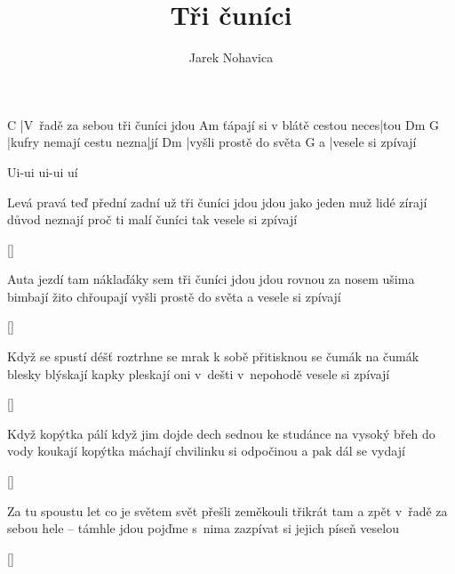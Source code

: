 \documentclass{song}
\author{Jarek Nohavica}
\title{Tři čuníci}
\begin{document}
\begin{multicols}{2}
\strophe
C
|V~řadě za sebou tři čuníci jdou
                              Am
ťápají si v blátě cestou neces|tou
Dm                       G\7
|kufry nemají cestu nezna|jí
Dm
|vyšli prostě do světa
  G\7
a |vesele si zpívají
\endstrophe

 Ui-ui ui-ui uí
\endstrophe

\strophe*
Levá pravá teď přední zadní už
tři čuníci jdou jdou jako jeden muž
lidé zírají důvod neznají
proč ti malí čuníci
tak vesele si zpívají
\endstrophe

\ref{}

\strophe*
Auta jezdí tam náklaďáky sem
tři čuníci jdou jdou rovnou za nosem
ušima bimbají žito chřoupají
vyšli prostě do světa
a vesele si zpívají
\endstrophe

\ref{}

\columnbreak

\strophe*
Když se spustí déšť roztrhne se mrak
k sobě přitisknou se čumák na čumák
blesky blýskají kapky pleskají
oni v~dešti v~nepohodě
vesele si zpívají
\endstrophe

\ref{}

\strophe*
Když kopýtka pálí když jim dojde dech
sednou ke studánce na vysoký břeh
do vody koukají kopýtka máchají
chvilinku si odpočinou
a pak dál se vydají
\endstrophe

\ref{}

\strophe*
Za tu spoustu let co je světem svět
přešli zeměkouli třikrát tam a zpět
v~řadě za sebou hele -- támhle jdou
pojďme s~nima zazpívat si
jejich píseň veselou
\endstrophe

\ref{}

\end{multicols}
\end{document}
